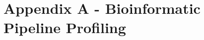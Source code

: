 \documentclass{standalone}
\begin{document}
\chapter*{Appendix A - Bioinformatic Pipeline Profiling}\label{profiling}







\end{document}
